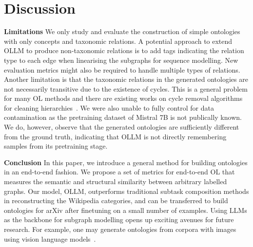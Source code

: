 \documentclass{article}
\newcommand{\name}{{OLLM}\xspace}
\begin{document}



\section{Discussion}  \label{sec:disccusion}

\textbf{Limitations } We only study and evaluate the construction of simple ontologies with only concepts and taxonomic relations. A potential approach to extend \name to produce non-taxonomic relations is to add tags indicating the relation type to each edge when linearising the subgraphs for sequence modelling. New evaluation metrics might also be required to handle multiple types of relations. Another limitation is that the taxonomic relations in the generated ontologies are not necessarily transitive due to the existence of cycles. This is a general problem for many OL methods and there are existing works on cycle removal algorithms for cleaning hierarchies~\cite{sun2017breaking,zesch2007analysis}. We were also unable to fully control for data contamination as the pretraining dataset of Mistral 7B is not publically known. We do, however, observe that the generated ontologies are sufficiently different from the ground truth, indicating that \name is not directly remembering samples from its pretraining stage.


\textbf{Conclusion } In this paper, we introduce a general method for building ontologies in an end-to-end fashion. We propose a set of metrics for end-to-end OL that measures the semantic and structural similarity between arbitrary labelled graphs. Our model, \name, outperforms traditional subtask composition methods in reconstructing the Wikipedia categories, and can be transferred to build ontologies for arXiv after finetuning on a small number of examples. Using LLMs as the backbone for subgraph modelling opens up exciting avenues for future research. For example, one may generate ontologies from corpora with images using vision language models~\cite{donahue2015long}.






\appendix



\newpage

\end{document}
